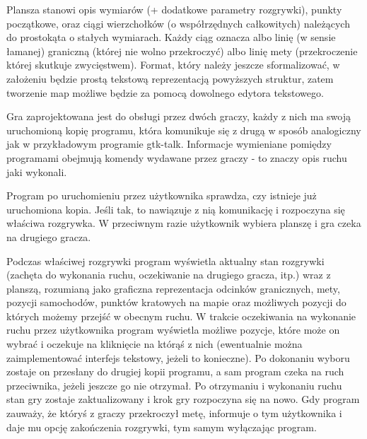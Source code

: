 \documentclass[10pt,a4paper]{report}
\begin{document}
Plansza stanowi opis wymiarów (+ dodatkowe parametry rozgrywki), punkty początkowe, oraz ciągi wierzchołków (o współrzędnych całkowitych) należących do prostokąta o stałych wymiarach. Każdy ciąg oznacza albo linię (w sensie łamanej) graniczną (której nie wolno przekroczyć) albo linię mety (przekroczenie której skutkuje zwycięstwem). Format, który należy jeszcze sformalizować, w założeniu będzie prostą tekstową reprezentacją powyższych struktur, zatem tworzenie map możliwe będzie za pomocą dowolnego edytora tekstowego.\par
Gra zaprojektowana jest do obsługi przez dwóch graczy, każdy z nich ma swoją uruchomioną kopię programu, która komunikuje się z drugą w sposób analogiczny jak w przykładowym programie gtk-talk. Informacje wymieniane pomiędzy programami obejmują komendy wydawane przez graczy - to znaczy opis ruchu jaki wykonali.\par 
Program po uruchomieniu przez użytkownika sprawdza, czy istnieje już uruchomiona kopia. Jeśli tak, to nawiązuje z nią komunikację i rozpoczyna się właściwa rozgrywka. W przeciwnym razie użytkownik wybiera planszę i gra czeka na drugiego gracza.\par 
Podczas właściwej rozgrywki program wyświetla aktualny stan rozgrywki (zachęta do wykonania ruchu, oczekiwanie na drugiego gracza, itp.) wraz z planszą, rozumianą jako graficzna reprezentacja odcinków granicznych, mety, pozycji samochodów, punktów kratowych na mapie oraz możliwych pozycji do których możemy przejść w obecnym ruchu. W trakcie oczekiwania na wykonanie ruchu przez użytkownika program wyświetla możliwe pozycje, które może on wybrać i oczekuje na kliknięcie na którąś z nich (ewentualnie można zaimplementować interfejs tekstowy, jeżeli to konieczne). Po dokonaniu wyboru zostaje on przesłany do drugiej kopii programu, a sam program czeka na ruch przeciwnika, jeżeli jeszcze go nie otrzymał. Po otrzymaniu i wykonaniu ruchu stan gry zostaje zaktualizowany i krok gry rozpoczyna się na nowo. Gdy program zauważy, że któryś z graczy przekroczył metę, informuje o tym użytkownika i daje mu opcję zakończenia rozgrywki, tym samym wyłączając program.
\end{document}
